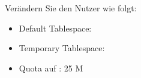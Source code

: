     \item Ver\"andern Sie den Nutzer  wie folgt:
    \begin{itemize}
      \item Default Tablespace: 
      \item Temporary Tablespace: 
      \item Quota auf : 25 M
    \end{itemize}
